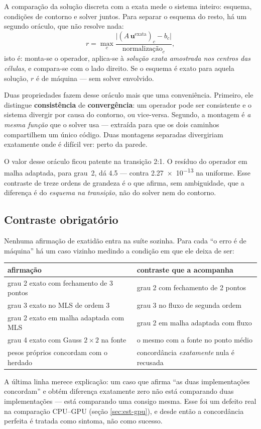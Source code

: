 A comparação da solução discreta com a exata mede o sistema inteiro: esquema,
condições de contorno e solver juntos. Para separar o esquema do resto, há um
segundo oráculo, que não resolve nada:
\begin{equation}
  r = \max_c \frac{\bigl|(A\,\mathbf{u}^{\text{exata}})_c - b_c\bigr|}{\text{normalização}_c},
  \label{eq:residuo}
\end{equation}
isto é: monta-se o operador, aplica-se à \emph{solução exata amostrada nos centros
das células}, e compara-se com o lado direito. Se o esquema é exato para aquela
solução, $r$ é de máquina --- sem solver envolvido.

Duas propriedades fazem desse oráculo mais que uma conveniência. Primeiro, ele
distingue \textbf{consistência} de \textbf{convergência}: um operador pode ser
consistente e o sistema divergir por causa do contorno, ou vice-versa. Segundo, a
montagem é \emph{a mesma função} que o solver usa --- extraída para que os dois
caminhos compartilhem um único código. Duas montagens separadas divergiriam
exatamente onde é difícil ver: perto da parede.

O valor desse oráculo ficou patente na transição 2:1. O resíduo do operador em
malha adaptada, para grau~2, dá \num{4.5} --- contra \num{2.27e-13} na uniforme.
Esse contraste de treze ordens de grandeza é o que afirma, sem ambiguidade, que a
diferença é do \emph{esquema na transição}, não do solver nem do contorno.

\subsection{Contraste obrigatório}

Nenhuma afirmação de exatidão entra na suíte sozinha. Para cada ``o erro é de
máquina'' há um caso vizinho medindo a condição em que ele deixa de ser:

\begin{center}
\begin{tabular}{ll}
\toprule
afirmação & contraste que a acompanha \\
\midrule
grau 2 exato com fechamento de 3 pontos & grau 2 com fechamento de 2 pontos \\
grau 3 exato no MLS de ordem 3 & grau 3 no fluxo de segunda ordem \\
grau 2 exato em malha adaptada com MLS & grau 2 em malha adaptada com fluxo \\
grau 4 exato com Gauss $2\times2$ na fonte & o mesmo com a fonte no ponto médio \\
pesos próprios concordam com o herdado & concordância \emph{exatamente} nula é recusada \\
\bottomrule
\end{tabular}
\end{center}

A última linha merece explicação: um caso que afirma ``as duas implementações
concordam'' e obtém diferença exatamente zero não está comparando duas
implementações --- está comparando uma consigo mesma. Esse foi um defeito real na
comparação CPU--GPU (seção \ref{sec:est-gpu}), e desde então a concordância
perfeita é tratada como sintoma, não como sucesso.
